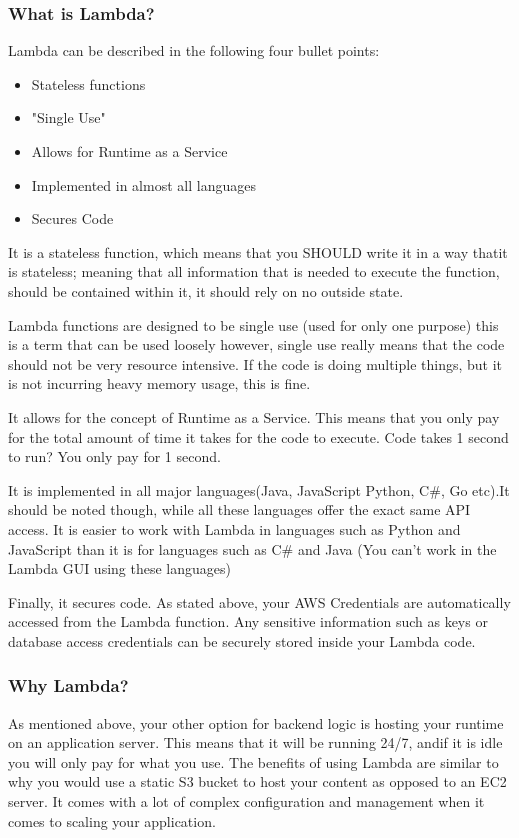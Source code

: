 \documentclass[runningheads]{llncs}
\begin{document}
\subsubsection{What is Lambda?}
Lambda can be described in the following four bullet points:
\begin{itemize}
	\item Stateless functions
	\item "Single Use"
	\item Allows for Runtime as a Service
	\item Implemented in almost all languages
	\item Secures Code
\end{itemize}

It is a stateless function, which means that you SHOULD write it in a way thatit is stateless; meaning that all information that is needed to execute the function, should be contained within it, it should rely on no outside state.

Lambda functions are designed to be single use (used for only one purpose) this is a term that can be used loosely however, single use really means that the code should not be very resource intensive. If the code is doing multiple things, but it is not incurring heavy memory usage, this is fine.

It allows for the concept of Runtime as a Service. This means that you only pay for the total amount of time it takes for the code to execute. Code takes 1 second to run? You only pay for 1 second.

It is implemented in all major languages(Java, JavaScript Python, C\#, Go etc).It should be noted though, while all these languages offer the exact same API access. It is easier to work with Lambda in languages such as Python and JavaScript than it is for languages such as C\# and Java (You can't work in the Lambda GUI using these languages)

Finally, it secures code. As stated above, your AWS Credentials are automatically accessed from the Lambda function. Any sensitive information such as keys or database access credentials can be securely stored inside your Lambda code.

\subsubsection{Why Lambda?}
As mentioned above, your other option for backend logic is hosting your runtime on an application server. This means that it will be running 24/7, andif it is idle you will only pay for what you use. The benefits of using Lambda are similar to why you would use a static S3 bucket to host your content as opposed to an EC2 server. It comes with a lot of complex configuration and management when it comes to scaling your application.
\end{document}
